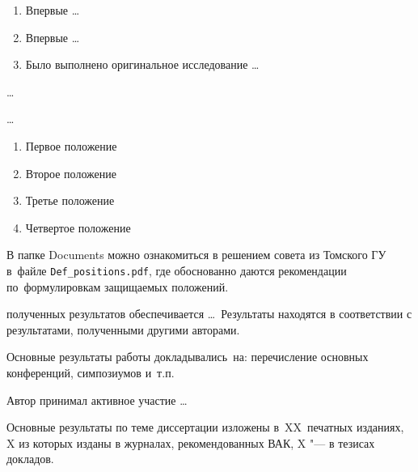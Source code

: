 {\novelty}
\begin{enumerate}[beginpenalty=10000] %
  \item Впервые \ldots
  \item Впервые \ldots
  \item Было выполнено оригинальное исследование \ldots
\end{enumerate}

{\influence} \ldots

{\methods} \ldots

{}
\begin{enumerate}[beginpenalty=10000] %
  \item Первое положение
  \item Второе положение
  \item Третье положение
  \item Четвертое положение
\end{enumerate}
В папке Documents можно ознакомиться в решением совета из Томского ГУ
в~файле \verb+Def_positions.pdf+, где обоснованно даются рекомендации
по~формулировкам защищаемых положений.

{\reliability} полученных результатов обеспечивается \ldots \ Результаты находятся в соответствии с результатами, полученными другими авторами.


{\probation}
Основные результаты работы докладывались~на:
перечисление основных конференций, симпозиумов и~т.\:п.

{\contribution} Автор принимал активное участие \ldots

{%
    {\publications} Основные результаты по теме диссертации изложены
    в~XX~печатных изданиях,
    X из которых изданы в журналах, рекомендованных ВАК,
    X "--- в тезисах докладов.
}%


